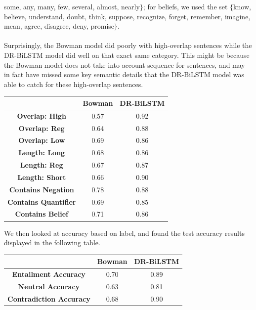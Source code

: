 \documentclass[12pt,letterpaper]{article}
\begin{document}
some, any, many, few, several, almost, nearly$\}$; for beliefs, we used the set $\{$know, believe,
understand, doubt, think, suppose, recognize,
forget, remember, imagine, mean, agree, disagree, deny, promise$\}$. \\ \\
Surprisingly, the Bowman model did poorly with high-overlap sentences while the DR-BiLSTM model did well on that exact same category. This might be because the Bowman model does not take into account sequence for sentences, and may in fact have missed some key semantic details that the DR-BiLSTM model was able to catch for these high-overlap sentences. 
\begin{center}
    \begin{tabular}{| c | c | c |} \hline
         &  \textbf{Bowman} & \textbf{DR-BiLSTM} \\
         \hline
        \textbf{Overlap: High} & 0.57 & 0.92 \\ 
        \hline
        \textbf{Overlap: Reg} & 0.64 & 0.88 \\
        \hline
        \textbf{Overlap: Low} & 0.69 & 0.86 \\
        \hline
        \textbf{Length: Long} & 0.68 & 0.86 \\
        \hline
        \textbf{Length: Reg} & 0.67 & 0.87 \\
        \hline
        \textbf{Length: Short} & 0.66 & 0.90 \\
        \hline
        \textbf{Contains Negation} & 0.78 & 0.88 \\
        \hline
        \textbf{Contains Quantifier} & 0.69 & 0.85 \\
        \hline
        \textbf{Contains Belief} & 0.71 & 0.86 \\
        \hline
    \end{tabular}
\end{center}
We then looked at accuracy based on label, and found the test accuracy results displayed in the following table. 
\begin{center}
    \begin{tabular}{|c|c|c|} \hline
         &  \textbf{Bowman} & \textbf{DR-BiLSTM}\\
         \hline
        \textbf{Entailment Accuracy} & 0.70 & 0.89 \\
        \hline
        \textbf{Neutral Accuracy} & 0.63 & 0.81 \\
        \hline
        \textbf{Contradiction Accuracy} & 0.68 & 0.90 \\
        \hline
    \end{tabular}
\end{center}
\end{document}
